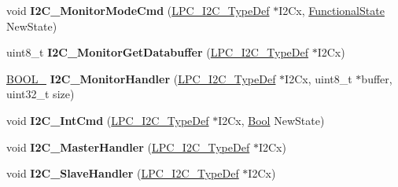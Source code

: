 \begin{DoxyCompactItemize}
\item 
\hypertarget{group___i2_c___public___functions_ga236d51a39fe46151b144b56f3d5d465a}{void {\bfseries \-I2\-C\-\_\-\-Monitor\-Mode\-Cmd} (\hyperlink{struct_l_p_c___i2_c___type_def}{\-L\-P\-C\-\_\-\-I2\-C\-\_\-\-Type\-Def} $\ast$\-I2\-Cx, \hyperlink{group___l_p_c___types___public___types_gac9a7e9a35d2513ec15c3b537aaa4fba1}{\-Functional\-State} \-New\-State)}\label{group___i2_c___public___functions_ga236d51a39fe46151b144b56f3d5d465a}

\item 
\hypertarget{group___i2_c___public___functions_gaeef5efb68afc2a65ffa08572d46fd472}{uint8\-\_\-t {\bfseries \-I2\-C\-\_\-\-Monitor\-Get\-Databuffer} (\hyperlink{struct_l_p_c___i2_c___type_def}{\-L\-P\-C\-\_\-\-I2\-C\-\_\-\-Type\-Def} $\ast$\-I2\-Cx)}\label{group___i2_c___public___functions_gaeef5efb68afc2a65ffa08572d46fd472}

\item 
\hypertarget{group___i2_c___public___functions_gaa8f87a55b16bacca9110c11ff285d3f9}{\hyperlink{group___l_p_c___types___public___types_ga39db6982619d623273fad8a383489309}{\-B\-O\-O\-L\-\_} {\bfseries \-I2\-C\-\_\-\-Monitor\-Handler} (\hyperlink{struct_l_p_c___i2_c___type_def}{\-L\-P\-C\-\_\-\-I2\-C\-\_\-\-Type\-Def} $\ast$\-I2\-Cx, uint8\-\_\-t $\ast$buffer, uint32\-\_\-t size)}\label{group___i2_c___public___functions_gaa8f87a55b16bacca9110c11ff285d3f9}

\item 
\hypertarget{group___i2_c___public___functions_gabdabf69925593fb4a7d93f576fe4818b}{void {\bfseries \-I2\-C\-\_\-\-Int\-Cmd} (\hyperlink{struct_l_p_c___i2_c___type_def}{\-L\-P\-C\-\_\-\-I2\-C\-\_\-\-Type\-Def} $\ast$\-I2\-Cx, \hyperlink{group___l_p_c___types___public___types_ga39db6982619d623273fad8a383489309}{\-Bool} \-New\-State)}\label{group___i2_c___public___functions_gabdabf69925593fb4a7d93f576fe4818b}

\item 
\hypertarget{group___i2_c___public___functions_ga2a72b0df9f2df2190c02f44bc5de8f0c}{void {\bfseries \-I2\-C\-\_\-\-Master\-Handler} (\hyperlink{struct_l_p_c___i2_c___type_def}{\-L\-P\-C\-\_\-\-I2\-C\-\_\-\-Type\-Def} $\ast$\-I2\-Cx)}\label{group___i2_c___public___functions_ga2a72b0df9f2df2190c02f44bc5de8f0c}

\item 
\hypertarget{group___i2_c___public___functions_gad6be7f7f521b9838d05cb033caae68d0}{void {\bfseries \-I2\-C\-\_\-\-Slave\-Handler} (\hyperlink{struct_l_p_c___i2_c___type_def}{\-L\-P\-C\-\_\-\-I2\-C\-\_\-\-Type\-Def} $\ast$\-I2\-Cx)}\label{group___i2_c___public___functions_gad6be7f7f521b9838d05cb033caae68d0}

\end{DoxyCompactItemize}
